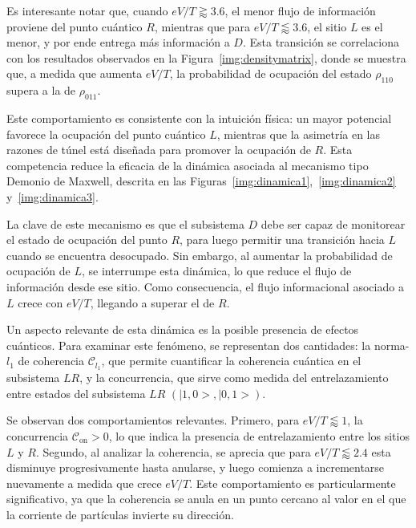 
Es interesante notar que, cuando \( eV/T \gtrapprox 3.6 \), el menor flujo de información proviene del punto cuántico \( R \), mientras que para \( eV/T \lessapprox 3.6 \), el sitio \( L \) es el menor, y por ende entrega más información a $D$. Esta transición se correlaciona con los resultados observados en la Figura~\ref{img:densitymatrix}, donde se muestra que, a medida que aumenta \( eV/T \), la probabilidad de ocupación del estado \( \rho_{110} \) supera a la de \( \rho_{011} \).

Este comportamiento es consistente con la intuición física: un mayor potencial favorece la ocupación del punto cuántico \( L \), mientras que la asimetría en las razones de túnel está diseñada para promover la ocupación de \( R \). Esta competencia reduce la eficacia de la dinámica asociada al mecanismo tipo Demonio de Maxwell, descrita en las Figuras~\ref{img:dinamica1},~\ref{img:dinamica2} y~\ref{img:dinamica3}.

La clave de este mecanismo es que el subsistema \( D \) debe ser capaz de monitorear el estado de ocupación del punto \( R \), para luego permitir una transición hacia \( L \) cuando se encuentra desocupado. Sin embargo, al aumentar la probabilidad de ocupación de \( L \), se interrumpe esta dinámica, lo que reduce el flujo de información desde ese sitio. Como consecuencia, el flujo informacional asociado a \( L \) crece con \( eV/T \), llegando a superar el de \( R \).

Un aspecto relevante de esta dinámica es la posible presencia de efectos cuánticos. Para examinar este fenómeno, se representan dos cantidades: la norma-$l_{1}$ de coherencia \( \mathcal{C}_{l_{1}} \), que permite cuantificar la coherencia cuántica en el subsistema \( LR \), y la concurrencia, que sirve como medida del entrelazamiento entre estados del subsistema $LR$ $(|1,0>,|0,1>)$.


Se observan dos comportamientos relevantes. Primero, para \( eV/T \lessapprox 1 \), la concurrencia \( \mathcal{C}_{\text{on}} > 0 \), lo que indica la presencia de entrelazamiento entre los sitios \( L \) y \( R \). Segundo, al analizar la coherencia, se aprecia que para \( eV/T \lessapprox 2.4 \) esta disminuye progresivamente hasta anularse, y luego comienza a incrementarse nuevamente a medida que crece \( eV/T \). Este comportamiento es particularmente significativo, ya que la coherencia se anula en un punto cercano al valor en el que la corriente de partículas invierte su dirección.

